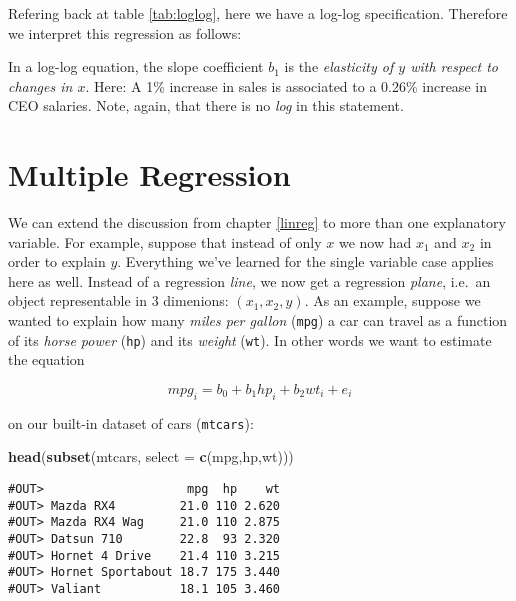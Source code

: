\documentclass[]{book}
\newenvironment{Shaded}{\begin{snugshade}}{\end{snugshade}}
\newcommand{\DataTypeTok}[1]{\textcolor[rgb]{0.13,0.29,0.53}{#1}}
\newcommand{\KeywordTok}[1]{\textcolor[rgb]{0.13,0.29,0.53}{\textbf{#1}}}
\newcommand{\NormalTok}[1]{#1}
\newenvironment{tip}{\begin{tcolorbox}[colback=green!5!white,colframe=green]}{\end{tcolorbox}}
\begin{document}
Refering back at table \ref{tab:loglog}, here we have a log-log specification. Therefore we interpret this regression as follows:

\begin{tip}
In a log-log equation, the slope coefficient \(b_1\) is the
\emph{elasticity of \(y\) with respect to changes in \(x\)}. Here: A 1\%
increase in sales is associated to a 0.26\% increase in CEO salaries.
Note, again, that there is no \emph{log} in this statement.
\end{tip}

\hypertarget{multiple-reg}{%
\chapter{Multiple Regression}\label{multiple-reg}}

We can extend the discussion from chapter \ref{linreg} to more than one explanatory variable. For example, suppose that instead of only \(x\) we now had \(x_1\) and \(x_2\) in order to explain \(y\). Everything we've learned for the single variable case applies here as well. Instead of a regression \emph{line}, we now get a regression \emph{plane}, i.e.~an object representable in 3 dimenions: \((x_1,x_2,y)\).
As an example, suppose we wanted to explain how many \emph{miles per gallon} (\texttt{mpg}) a car can travel as a function of its \emph{horse power} (\texttt{hp}) and its \emph{weight} (\texttt{wt}). In other words we want to estimate the equation

\begin{equation}
mpg_i = b_0 + b_1 hp_i + b_2 wt_i + e_i \label{eq:abline2d}
\end{equation}

on our built-in dataset of cars (\texttt{mtcars}):

\begin{Shaded}
\begin{Highlighting}[]
\KeywordTok{head}\NormalTok{(}\KeywordTok{subset}\NormalTok{(mtcars, }\DataTypeTok{select =} \KeywordTok{c}\NormalTok{(mpg,hp,wt)))}
\end{Highlighting}
\end{Shaded}

\begin{verbatim}
#OUT>                    mpg  hp    wt
#OUT> Mazda RX4         21.0 110 2.620
#OUT> Mazda RX4 Wag     21.0 110 2.875
#OUT> Datsun 710        22.8  93 2.320
#OUT> Hornet 4 Drive    21.4 110 3.215
#OUT> Hornet Sportabout 18.7 175 3.440
#OUT> Valiant           18.1 105 3.460
\end{verbatim}
\end{document}
